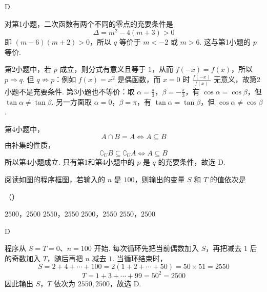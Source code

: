 \begin{answer}
D
\end{answer}

\begin{solution}
对第1小题，二次函数有两个不同的零点的充要条件是
\[
\Delta=m^2-4(m+3)>0
\]
即 \((m-6)(m+2)>0\)，所以 \(q\) 等价于 \(m<-2\) 或 \(m>6\). 这与第1小题的 \(p\) 等价.

第2小题中，若 \(p\) 成立，则分式有意义且等于 \(1\)，从而 \(f(-x)=f(x)\)，所以 \(p\Rightarrow q\). 但 \(q\not\Rightarrow p\)：例如 \(f(x)=x^2\) 是偶函数，而 \(x=0\) 时 \(\frac{f(-x)}{f(x)}\) 无意义，故第2小题不是充要条件. 第3小题也不等价：取 \(\alpha=\frac{\pi}{3}\)，\(\beta=-\frac{\pi}{3}\)，有 \(\cos\alpha=\cos\beta\)，但 \(\tan\alpha\neq\tan\beta\). 另一方面取 \(\alpha=0\)，\(\beta=\pi\)，有 \(\tan\alpha=\tan\beta\)，但 \(\cos\alpha\neq\cos\beta\).

第4小题中，
\[
A\cap B=A\Longleftrightarrow A\subseteq B
\]
由补集的性质，
\[
\complement_U B\subseteq\complement_U A\Longleftrightarrow A\subseteq B
\]
所以第4小题成立. 只有第1和第4小题中的 \(p\) 是 \(q\) 的充要条件，故选 D.
\end{solution}

\begin{problem}
阅读如图的程序框图，若输入的 \(n\) 是 \(100\)，则输出的变量 \(S\) 和 \(T\) 的值依次是

\FloatBarrier

（\quad）

\choices
    {\(2500\)，\(2500\)}
    {\(2550\)，\(2550\)}
    {\(2500\)，\(2550\)}
    {\(2550\)，\(2500\)}

\begin{answer}D\end{answer}

\begin{solution}
程序从 \(S=T=0\)、\(n=100\) 开始. 每次循环先把当前偶数加入 \(S\)，再把减去 \(1\) 后的奇数加入 \(T\)，随后再把 \(n\) 减去 \(1\). 当循环结束时，
\[
S=2+4+\cdots+100=2(1+2+\cdots+50)=50\times51=2550
\]
\[
T=1+3+\cdots+99=50^2=2500
\]
因此输出 \(S\)，\(T\) 依次为 \(2550,2500\)，故选 D.
\end{solution}
\end{problem}

